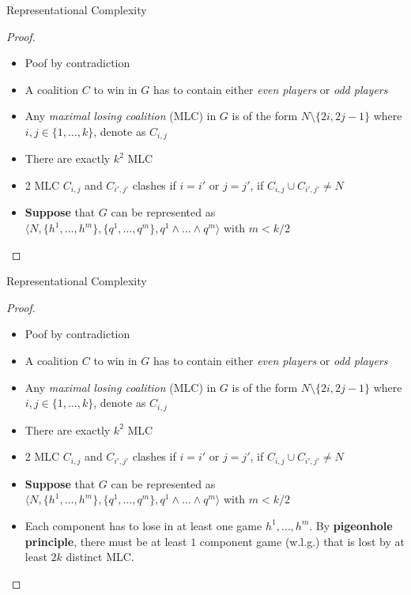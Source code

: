 \documentclass{beamer}
\begin{document}
\begin{frame}[fragile]{Representational Complexity}
  \begin{proof}
    \begin{itemize}
      \item Poof by contradiction
      \item A coalition $C$ to win in $G$ has to contain either \textit{even players} or \textit{odd players}
      \item Any \textit{maximal losing coalition} (MLC) in $G$ is of the form $N \setminus \{2i, 2j - 1\}$ where
      $i,j \in \{1,\dots,k\}$, denote as $C_{i,j}$
      \item There are exactly $k^2$ MLC
      \item 2 MLC $C_{i,j}$ and $C_{i',j'}$ clashes if $i=i'$ or $j= j'$, if $C_{i,j} \cup C_{i',j'} \neq N$
      \item \textbf{Suppose} that $G$ can be represented as $\langle N, \{h^1, \dots, h^m\}, \{q^1, \dots, q^m\}, q^1 \land \dots \land q^m \rangle$ with $m < k/2$
    \end{itemize}
  \end{proof}
\end{frame}

\begin{frame}[fragile]{Representational Complexity}
  \begin{proof}
    \begin{itemize}
      \item Poof by contradiction
      \item A coalition $C$ to win in $G$ has to contain either \textit{even players} or \textit{odd players}
      \item Any \textit{maximal losing coalition} (MLC) in $G$ is of the form $N \setminus \{2i, 2j - 1\}$ where
      $i,j \in \{1,\dots,k\}$, denote as $C_{i,j}$
      \item There are exactly $k^2$ MLC
      \item 2 MLC $C_{i,j}$ and $C_{i',j'}$ clashes if $i=i'$ or $j= j'$, if $C_{i,j} \cup C_{i',j'} \neq N$
      \item \textbf{Suppose} that $G$ can be represented as $\langle N, \{h^1, \dots, h^m\}, \{q^1, \dots, q^m\}, q^1 \land \dots \land q^m \rangle$ with $m < k/2$
      \item Each component has to lose in at least one game $h^1, \dots, h^m$. By \textbf{pigeonhole principle}, there must be at least $1$
      component game (w.l.g.) that is lost by at least $2k$ distinct MLC.
    \end{itemize}
  \end{proof}
\end{frame}
\end{document}
